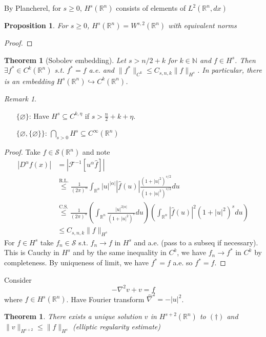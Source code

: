\documentclass{article}
\theoremstyle{definition}
\theoremstyle{remark}
\newtheorem{rem}{Remark}
\theoremstyle{plain}
\newtheorem{thm}[defn]{Theorem}
\newtheorem{prop}[defn]{Proposition}
\newcommand{\NN}{\mathbb{N}}
\newcommand{\RR}{\mathbb{R}}
\begin{document}
By Plancherel, for $s\ge 0$, $H^s(\RR^n)$ consists of elements of $L^2(\RR^n,dx)$
\begin{prop}
    For $s\ge 0$, $H^s(\RR^n)= W^{s,2}(\RR^n)$ with equivalent norms
\end{prop}
\begin{proof}
    
\end{proof}
\begin{thm}[Sobolev embedding]
    Let $s>n/2+k$ for $k\in\NN$ and $f\in H^s$. Then $\exists f^\ast\in C^k(\RR^n)$ s.t. $f^\ast=f$ a.e. and $\|f^\ast\|_{C^k}\le C_{s,n,k}\|f\|_{H^s}$. In particular, there is an embedding $H^s(\RR^n)\hookrightarrow C^k(\RR^n)$.
\end{thm}
\begin{rem}\
\begin{enumerate}
    \item[$\{\varnothing\}$:] Have $H^s\subseteq C^{k,\eta}$ if $s>\frac n2+k+\eta$.
    \item[$\{\varnothing,\{\varnothing\}\}$:]$\bigcap_{s>0}H^s\subseteq C^\infty(\RR^n)$
\end{enumerate}
\end{rem}
\begin{proof}
    Take $f\in \mathcal S(\RR^n)$ and note
    \begin{align*}
        |D^\alpha f(x)|&=|\mathcal F^{-1}[u^\alpha \hat f]|\\
        &\overset{\text{R.L.}}{\le} \frac{1}{(2\pi)^n}\int_{\RR^n}|u|^{|\alpha|}|\hat f(u)|\frac{(1+|u|^2)^{s/2}}{(1+|u|^2)^{s/2}}du\\
        &\overset{\text{C.S.}}{\le}\frac{1}{(2\pi)^n}\left(\int_{\RR^n}\frac{|u|^{2|\alpha|}}{(1+|u|^2)^s}du\right)\left(\int_{\RR^n}|\hat f(u)|^2(1+|u|^2)^sdu\right)\\
        &\le C_{s,n,k}\|f\|_{H^s}
    \end{align*}
    For $f\in H^s$ take $f_n\in\mathcal S$ s.t. $f_n\to f$ in $H^s$ and a.e. (pass to a subseq if necessary). This is Cauchy in $H^s$ and by the same inequality in $C^k$, we have $f_n\to f^\ast$ in $C^k$ by completeness. By uniqueness of limit, we have $f^\ast=f$ a.e. so $f^\ast =f $.
\end{proof}
Consider \[-\nabla^2v+v=f\tag{$\dagger$}\]
where $f\in H^s(\RR^n)$. Have Fourier transform $\hat\nabla^2=-|u|^2$.
\begin{thm}
    There exists a unique solution $v$ in $H^{s+2}(\RR^n)$ to $(\dagger)$ and $\|v\|_{H^{s+2}}\le \|f\|_{H^s}$ (elliptic regularity estimate)
\end{thm}
\end{document}
